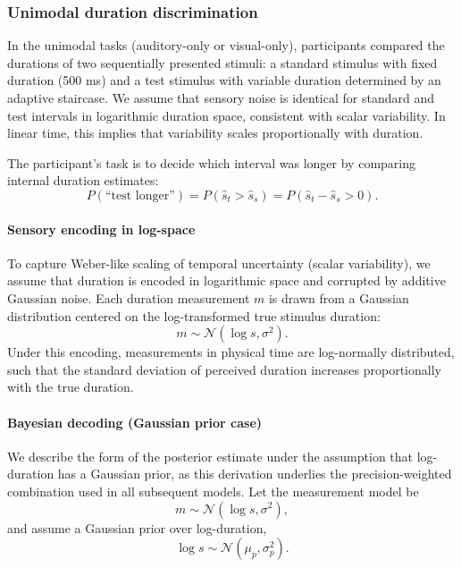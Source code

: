 \documentclass[9pt,lineno,doublespacing]{elife}
\begin{document}
\subsubsection{Unimodal duration discrimination}

In the unimodal tasks (auditory-only or visual-only), participants compared the durations of two sequentially presented stimuli: a standard stimulus with fixed duration (500 ms) and a test stimulus with variable duration determined by an adaptive staircase. We assume that sensory noise is identical for standard and test intervals in logarithmic duration space, consistent with scalar variability. In linear time, this implies that variability scales proportionally with duration. 


The participant's task is to decide which interval was longer by comparing internal duration estimates:
\begin{equation}
P(\text{``test longer''}) = P(\hat{s}_t > \hat{s}_s) = P(\hat{s}_t - \hat{s}_s > 0).
\end{equation}


\paragraph{Sensory encoding in log-space}
To capture Weber-like scaling of temporal uncertainty (scalar variability), we assume that duration is encoded in logarithmic space and corrupted by additive Gaussian noise. Each duration measurement $m$ is drawn from a Gaussian distribution centered on the log-transformed true stimulus duration:
\begin{equation}
m \sim \mathcal{N}(\log s, \sigma^2).
\end{equation}
Under this encoding, measurements in physical time are log-normally distributed, such that the standard deviation of perceived duration increases proportionally with the true duration.


\paragraph{Bayesian decoding (Gaussian prior case)}

We describe the form of the posterior estimate under the assumption that log-duration has a Gaussian prior, as this derivation underlies the precision-weighted combination used in all subsequent models. 
Let the measurement model be
\begin{equation}
m \sim \mathcal{N}(\log s, \sigma^2),
\label{eq:likelihood}
\end{equation}
and assume a Gaussian prior over log-duration,
\begin{equation}
\log s \sim \mathcal{N}(\mu_p, \sigma_p^2).
\label{eq:prior}
\end{equation}
\end{document}
